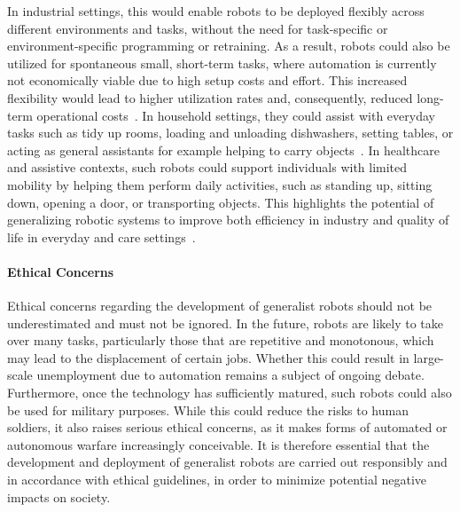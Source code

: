 In industrial settings, this would enable robots to be deployed flexibly across different environments and tasks, without the need for task-specific or environment-specific programming or retraining. As a result, robots could also be utilized for spontaneous small, short-term tasks, where automation is currently not economically viable due to high setup costs and effort. This increased flexibility would lead to higher utilization rates and, consequently, reduced long-term operational costs~\cite{tsujiSurveyImitationLearning2026}.
In household settings, they could assist with everyday tasks such as tidy up rooms, loading and unloading dishwashers, setting tables, or acting as general assistants for example helping to carry objects~\cite{Yang2025PreservingSO}.
In healthcare and assistive contexts, such robots could support individuals with limited mobility by helping them perform daily activities, such as standing up, sitting down, opening a door, or transporting objects. This highlights the potential of generalizing robotic systems to improve both efficiency in industry and quality of life in everyday and care settings~\cite{tsujiSurveyImitationLearning2026}.

\paragraph{Ethical Concerns} 
Ethical concerns regarding the development of generalist robots should not be underestimated and must not be ignored. In the future, robots are likely to take over many tasks, particularly those that are repetitive and monotonous, which may lead to the displacement of certain jobs. Whether this could result in large-scale unemployment due to automation remains a subject of ongoing debate.
Furthermore, once the technology has sufficiently matured, such robots could also be used for military purposes. While this could reduce the risks to human soldiers, it also raises serious ethical concerns, as it makes forms of automated or autonomous warfare increasingly conceivable.
It is therefore essential that the development and deployment of generalist robots are carried out responsibly and in accordance with ethical guidelines, in order to minimize potential negative impacts on society.



